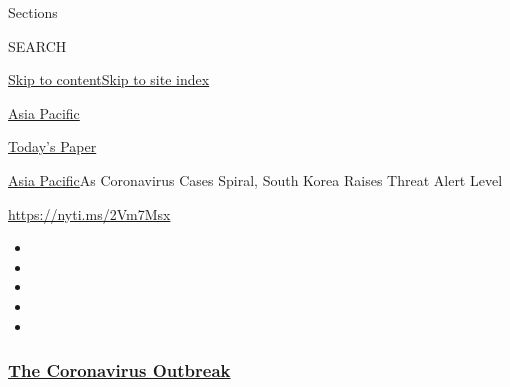 Sections

SEARCH

\protect\hyperlink{site-content}{Skip to
content}\protect\hyperlink{site-index}{Skip to site index}

\href{https://www.nytimes.com/section/world/asia}{Asia Pacific}

\href{https://myaccount.nytimes.com/auth/login?response_type=cookie\&client_id=vi}{}

\href{https://www.nytimes.com/section/todayspaper}{Today's Paper}

\href{/section/world/asia}{Asia Pacific}\textbar{}As Coronavirus Cases
Spiral, South Korea Raises Threat Alert Level

\url{https://nyti.ms/2Vm7Msx}

\begin{itemize}
\item
\item
\item
\item
\item
\end{itemize}

\hypertarget{the-coronavirus-outbreak}{%
\subsubsection{\texorpdfstring{\href{https://www.nytimes.com/news-event/coronavirus?name=styln-coronavirus-national\&region=TOP_BANNER\&variant=undefined\&block=storyline_menu_recirc\&action=click\&pgtype=Article\&impression_id=270072f0-e0fd-11ea-96b9-2bfa791110bd}{The
Coronavirus
Outbreak}}{The Coronavirus Outbreak}}\label{the-coronavirus-outbreak}}

